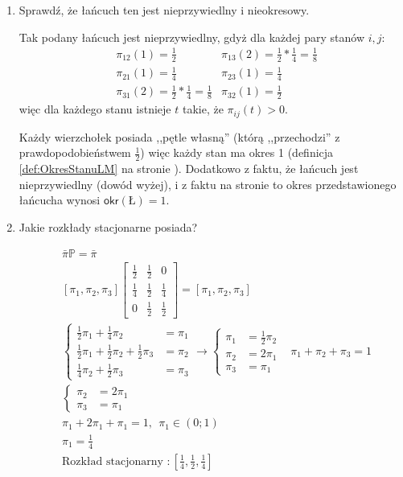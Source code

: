 \documentclass[a4paper,12pt]{article}
\theoremstyle{definition}%
\theoremstyle{definition}
\theoremstyle{problem}
\begin{document}
\begin{enumerate}[label=\alph*)]
\item Sprawdź, że łańcuch ten jest nieprzywiedlny i nieokresowy.

Tak podany łańcuch jest nieprzywiedlny, gdyż dla każdej pary stanów $i,j$:
\begin{align*}
&\pi _{12}(1) = \frac{1}{2} &\pi _{13}(2) = \frac{1}{2}*\frac{1}{4}=\frac{1}{8}\\
&\pi _{21}(1) =\frac{1}{4} &\pi _{23}(1) =\frac{1}{4}\\
&\pi _{31}(2) =\frac{1}{2}*\frac{1}{4}=\frac{1}{8}&\pi _{32}(1) =\frac{1}{2}
\end{align*}
więc dla każdego stanu istnieje $t$ takie, że $\pi_{ij}(t)>0$.

Każdy wierzchołek posiada ,,pętle własną'' (którą ,,przechodzi'' z prawdopodobieństwem $\frac{1}{2}$) więc każdy stan ma okres 1 (definicja \ref{def:OkresStanuLM} na stronie \pageref{def:OkresStanuLM}). Dodatkowo z faktu, że łańcuch jest nieprzywiedlny (dowód wyżej), i z faktu na stronie \pageref{fac:OkresLM} to okres przedstawionego łańcucha wynosi $\mathsf{okr}(Ł)=1$.
\item Jakie rozkłady stacjonarne posiada?

\begin{align*}
&\bar{\pi}\mathbb{P}=\bar{\pi}\\
&\left[\pi _1, \pi _2,\pi _3\right]\begin{bmatrix}
\frac{1}{2}&\frac{1}{2}&0\\
\frac{1}{4}&\frac{1}{2}&\frac{1}{4}\\
0&\frac{1}{2}&\frac{1}{2}
\end{bmatrix}=\left[\pi _1, \pi _2,\pi _3\right]\\
&\left\{\begin{matrix}
\frac{1}{2}\pi _1 + \frac{1}{4}\pi _2&=\pi _1\\
\frac{1}{2}\pi _1+\frac{1}{2}\pi _2+\frac{1}{2}\pi _3&=\pi _2\\
\frac{1}{4}\pi _2+\frac{1}{2}\pi _3 &=\pi _3
\end{matrix}\right. \rightarrow \left\{\begin{matrix}
\pi _1 &=\frac{1}{2}\pi _2\\
\pi _2 &= 2\pi _1\\
\pi _3&= \pi _1
\end{matrix}\right.
&\pi _1 + \pi_2 + \pi _3 = 1\\
&\left\{\begin{matrix}
\pi _2 &= 2\pi _1\\
\pi _3&= \pi _1
\end{matrix}\right.\\
&\pi _1 + 2\pi _1 + \pi _1 = 1, \ \ \pi _1\in (0;1)\\
&\pi _1 = \frac{1}{4}\\
&\text{Rozkład stacjonarny }:\left[\frac{1}{4}, \frac{1}{2}, \frac{1}{4}\right]
\end{align*}


\end{enumerate}
\end{document}

